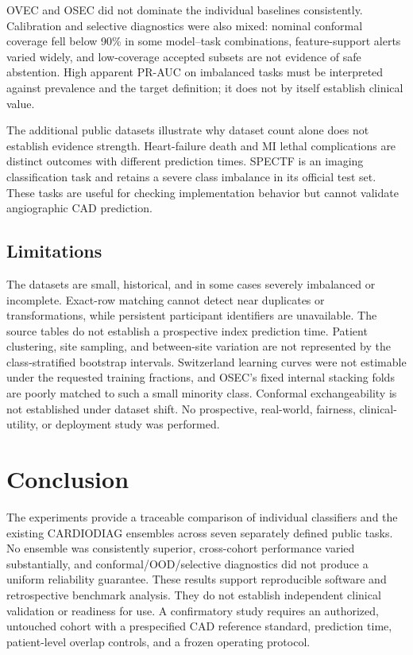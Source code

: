 \documentclass[conference]{IEEEtran}
\begin{document}
OVEC and OSEC did not dominate the individual baselines consistently. Calibration and selective diagnostics were also mixed: nominal conformal coverage fell below 90\% in some model--task combinations, feature-support alerts varied widely, and low-coverage accepted subsets are not evidence of safe abstention. High apparent PR-AUC on imbalanced tasks must be interpreted against prevalence and the target definition; it does not by itself establish clinical value.

The additional public datasets illustrate why dataset count alone does not establish evidence strength. Heart-failure death and MI lethal complications are distinct outcomes with different prediction times. SPECTF is an imaging classification task and retains a severe class imbalance in its official test set. These tasks are useful for checking implementation behavior but cannot validate angiographic CAD prediction.

\subsection{Limitations}
The datasets are small, historical, and in some cases severely imbalanced or incomplete. Exact-row matching cannot detect near duplicates or transformations, while persistent participant identifiers are unavailable. The source tables do not establish a prospective index prediction time. Patient clustering, site sampling, and between-site variation are not represented by the class-stratified bootstrap intervals. Switzerland learning curves were not estimable under the requested training fractions, and OSEC's fixed internal stacking folds are poorly matched to such a small minority class. Conformal exchangeability is not established under dataset shift. No prospective, real-world, fairness, clinical-utility, or deployment study was performed.

\section{Conclusion}
The experiments provide a traceable comparison of individual classifiers and the existing CARDIODIAG ensembles across seven separately defined public tasks. No ensemble was consistently superior, cross-cohort performance varied substantially, and conformal/OOD/selective diagnostics did not produce a uniform reliability guarantee. These results support reproducible software and retrospective benchmark analysis. They do not establish independent clinical validation or readiness for use. A confirmatory study requires an authorized, untouched cohort with a prespecified CAD reference standard, prediction time, patient-level overlap controls, and a frozen operating protocol.
\end{document}

